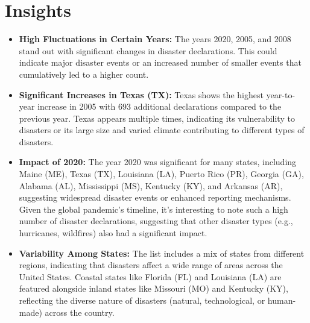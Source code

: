 \documentclass[12pt]{report}\usepackage[]{graphicx}\usepackage[]{xcolor}
\begin{document}
\section{Insights}
\begin{itemize}
  \item \textbf{High Fluctuations in Certain Years:} The years 2020, 2005, and 2008 stand out with significant changes in disaster declarations. This could indicate major disaster events or an increased number of smaller events that cumulatively led to a higher count.
  
  \item \textbf{Significant Increases in Texas (TX):} Texas shows the highest year-to-year increase in 2005 with 693 additional declarations compared to the previous year. Texas appears multiple times, indicating its vulnerability to disasters or its large size and varied climate contributing to different types of disasters.
  
  \item \textbf{Impact of 2020:} The year 2020 was significant for many states, including Maine (ME), Texas (TX), Louisiana (LA), Puerto Rico (PR), Georgia (GA), Alabama (AL), Mississippi (MS), Kentucky (KY), and Arkansas (AR), suggesting widespread disaster events or enhanced reporting mechanisms. Given the global pandemic's timeline, it's interesting to note such a high number of disaster declarations, suggesting that other disaster types (e.g., hurricanes, wildfires) also had a significant impact.
  
  \item \textbf{Variability Among States:} The list includes a mix of states from different regions, indicating that disasters affect a wide range of areas across the United States. Coastal states like Florida (FL) and Louisiana (LA) are featured alongside inland states like Missouri (MO) and Kentucky (KY), reflecting the diverse nature of disasters (natural, technological, or human-made) across the country.
  
\end{itemize}
\end{document}
